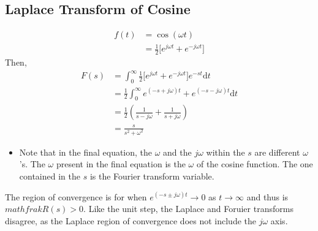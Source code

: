 \documentclass[10pt]{article}
\newcommand{\dd}{\text{d}}
\begin{document}
\subsection*{Laplace Transform of Cosine}
\begin{align*}
    f(t) &= \cos(\omega t)\\
    &= \frac{1}{2}\big[e^{j\omega t} + e^{-j\omega t}]
\end{align*}
Then,
\begin{align*}
    F(s) &= \int_0^\infty \frac{1}{2} \big[e^{j\omega t} + e^{-j\omega t}] e^{-st} \dd t\\
    &= \frac{1}{2} \int_0^\infty e^{(-s + j\omega)t} + e^{(-s-j\omega)t} \dd t\\
    &= \frac{1}{2} \left(\frac{1}{s-j\omega} + \frac{1}{s + j\omega}\right)\\
    &= \frac{s}{s^2 + \omega^2}
\end{align*}
\begin{itemize}
    \item Note that in the final equation, the $\omega$ and the $j\omega$ within the $s$ are different $\omega$'s.  The $\omega$ present in the final equation is the $\omega$ of the cosine function.  The one contained in the $s$ is the Fourier transform variable.
\end{itemize}
The region of convergence is for when $e^{(-s\pm j\omega)t} \rightarrow 0$ as $t \rightarrow \infty$ and thus is $mathfrak{R}(s) > 0$.  Like the unit step, the Laplace and Foruier transforms disagree, as the Laplace region of convergence does not include the $j\omega$ axis.
\end{document}
